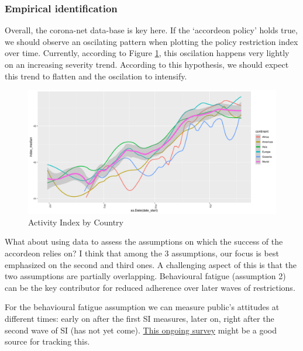 \documentclass[
  english,
  ,doc,floatsintext]{apa6}
\begin{document}
\hypertarget{empirical-identification}{%
\subsubsection{Empirical identification}\label{empirical-identification}}

Overall, the corona-net data-base is key here.
If the `accordeon policy' holds true, we should observe an oscilating pattern when plotting the policy restriction index over time.
Currently, according to Figure \ref{fig:ActIndex}, this oscilation happens very lightly on an increasing severity trend.
According to this hypothesis, we should expect this trend to flatten and the oscilation to intensify.

\begin{figure}
\centering
\includegraphics{covid-19_2_files/figure-latex/ActIndex-1.pdf}
\caption{\label{fig:ActIndex}Activity Index by Country}
\end{figure}

What about using data to assess the assumptions on which the success of the accordeon relies on?
I think that among the 3 assumptions, our focus is best emphasized on the second and third ones.
A challenging aspect of this is that the two assumptions are partially overlapping.
Behavioural fatigue (assumption 2) can be the key contributor for reduced adherence over later waves of restrictions.

For the behavioural fatigue assumption we can measure public's attitudes at different times: early on after the first SI measures, later on, right after the second wave of SI (has not yet come). \href{https://www.nber.org/papers/w27082}{This ongoing survey} might be a good source for tracking this.
\end{document}
